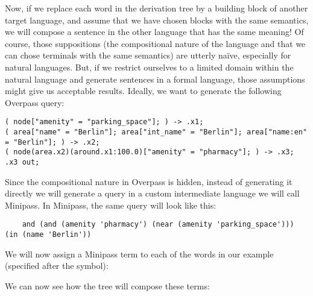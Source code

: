 \documentclass[main.tex]{subfiles}
\begin{document}
Now, if we replace each word in the derivation tree by a building block of another
target language, and assume that we have chosen blocks with the same semantics,
we will compose a sentence in the other language that has the same meaning!
Of course, those suppositions (the compositional nature of the language and
that we can chose terminals with the same semantics) are utterly naïve,
especially for natural languages. But, if we restrict ourselves to a limited
domain within the natural language and generate sentences in a formal language,
those assumptions might give us acceptable results.
\pagebreak
Ideally, we want to generate the following Overpass query:
\begin{lstwrap}\begin{lstlisting}
( node["amenity" = "parking_space"]; ) -> .x1;
( area["name" = "Berlin"]; area["int_name" = "Berlin"]; area["name:en" = "Berlin"]; ) -> .x2;
( node(area.x2)(around.x1:100.0)["amenity" = "pharmacy"]; ) -> .x3;
.x3 out;
\end{lstlisting}\end{lstwrap}

Since the compositional nature in Overpass is hidden, instead of generating
it directly we will generate a query in a custom intermediate language we will
call Minipass. In Minipass, the same query will look like this:
\begin{lstwrap}\begin{lstlisting}
    and (and (amenity 'pharmacy') (near (amenity 'parking_space'))) (in (name 'Berlin'))
\end{lstlisting}\end{lstwrap}

We will now assign a Minipass term to each of the words in our example (specified
after the  symbol):

We can now see how the tree will compose these terms:
\end{document}

